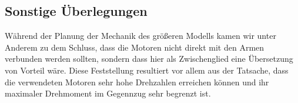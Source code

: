 \subsection{Sonstige Überlegungen}
Während der Planung der Mechanik des größeren Modells kamen wir unter Anderem zu dem Schluss, dass die Motoren nicht direkt mit den Armen verbunden werden sollten, sondern dass hier als Zwischenglied eine Übersetzung von Vorteil wäre. Diese Feststellung resultiert vor allem aus der Tatsache, dass die verwendeten Motoren sehr hohe Drehzahlen erreichen können und ihr maximaler Drehmoment im Gegennzug sehr begrenzt ist.
